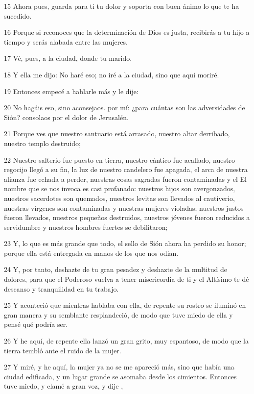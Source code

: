\par 15 Ahora pues, guarda para ti tu dolor y soporta con buen ánimo lo que te ha sucedido.
\par 16 Porque si reconoces que la determinación de Dios es justa, recibirás a tu hijo a tiempo y serás alabada entre las mujeres.
\par 17 Vé, pues, a la ciudad, donde tu marido.
\par 18 Y ella me dijo: No haré eso; no iré a la ciudad, sino que aquí moriré.
\par 19 Entonces empecé a hablarle más y le dije:
\par 20 No hagáis eso, sino aconsejaos. por mí: ¿para cuántas son las adversidades de Sión? consolaos por el dolor de Jerusalén.
\par 21 Porque ves que nuestro santuario está arrasado, nuestro altar derribado, nuestro templo destruido;
\par 22 Nuestro salterio fue puesto en tierra, nuestro cántico fue acallado, nuestro regocijo llegó a su fin, la luz de nuestro candelero fue apagada, el arca de nuestra alianza fue echada a perder, nuestras cosas sagradas fueron contaminadas y el El nombre que se nos invoca es casi profanado: nuestros hijos son avergonzados, nuestros sacerdotes son quemados, nuestros levitas son llevados al cautiverio, nuestras vírgenes son contaminadas y nuestras mujeres violadas; nuestros justos fueron llevados, nuestros pequeños destruidos, nuestros jóvenes fueron reducidos a servidumbre y nuestros hombres fuertes se debilitaron;
\par 23 Y, lo que es más grande que todo, el sello de Sión ahora ha perdido su honor; porque ella está entregada en manos de los que nos odian.
\par 24 Y, por tanto, deshazte de tu gran pesadez y deshazte de la multitud de dolores, para que el Poderoso vuelva a tener misericordia de ti y el Altísimo te dé descanso y tranquilidad en tu trabajo.
\par 25 Y aconteció que mientras hablaba con ella, de repente su rostro se iluminó en gran manera y su semblante resplandeció, de modo que tuve miedo de ella y pensé qué podría ser.
\par 26 Y he aquí, de repente ella lanzó un gran grito, muy espantoso, de modo que la tierra tembló ante el ruido de la mujer.
\par 27 Y miré, y he aquí, la mujer ya no se me apareció más, sino que había una ciudad edificada, y un lugar grande se asomaba desde los cimientos. Entonces tuve miedo, y clamé a gran voz, y dije ,
